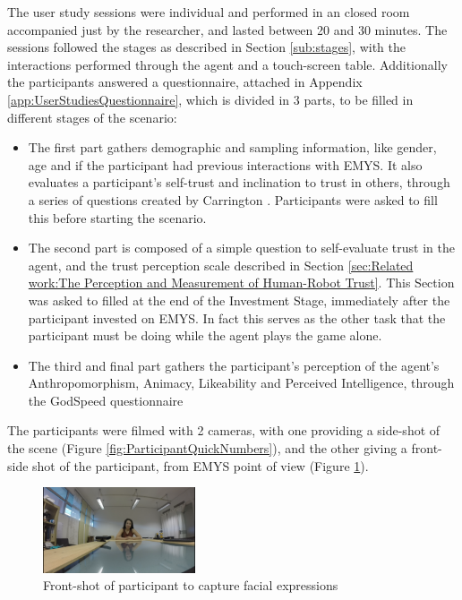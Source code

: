 The user study sessions were individual and performed in an closed room accompanied just by the researcher, and lasted between 20 and 30 minutes. The sessions followed the stages as described in Section \ref{sub:stages}, with the interactions performed through the agent and a touch-screen table. Additionally the participants answered a questionnaire, attached in Appendix \ref{app:UserStudiesQuestionnaire}, which is divided in 3 parts, to be filled in different stages of the scenario: 

\begin{itemize}
    \item The first part gathers demographic and sampling information, like gender, age and if the participant had previous interactions with \ac{EMYS}. It also evaluates a participant's self-trust and inclination to trust in others, through a series of questions created by Carrington \cite{Carrington2007}. Participants were asked to fill this before starting the scenario.
    \item The second part is composed of a simple question to self-evaluate trust in the agent, and the trust perception scale described in Section \ref{sec:Related work:The Perception and Measurement of Human-Robot Trust}. This Section was asked to filled at the end of the Investment Stage, immediately after the participant invested on \ac{EMYS}. In fact this serves as the other task that the participant must be doing while the agent plays the game alone.
    \item The third and final part gathers the participant's perception of the agent's Anthropomorphism, Animacy, Likeability and Perceived Intelligence, through the GodSpeed questionnaire \cite{Bartneck2009,Lehmann2015}
\end{itemize}

The participants were filmed with 2 cameras, with one providing a side-shot of the scene (Figure \ref{fig:ParticipantQuickNumbers}), and the other giving a front-side shot of the participant, from \ac{EMYS} point of view (Figure \ref{fig:ScenarioFrontShot}).

\begin{figure}[hbt]
    \centering
    \includegraphics[width=0.4\textwidth]{figures/ScenarioFrontShot.png}
    \caption{Front-shot of participant to capture facial expressions}
    \label{fig:ScenarioFrontShot}
\end{figure}

